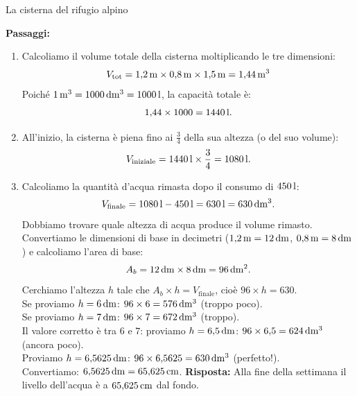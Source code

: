 \begin{esercizio}{La cisterna del rifugio alpino}
\begin{soluzione}
  \textbf{Passaggi:}
  \begin{enumerate}[label=\alph*)]
    \item Calcoliamo il volume totale della cisterna moltiplicando le tre dimensioni:
    \[
    V_{\text{tot}} = 1{,}2\,\mathrm{m} \times 0{,}8\,\mathrm{m} \times 1{,}5\,\mathrm{m} = 1{,}44\,\mathrm{m^3}
    \]
    Poiché $1\,\mathrm{m^3} = 1000\,\mathrm{dm^3} = 1000\,\mathrm{l}$, la capacità totale è:
    \[
    1{,}44 \times 1000 = 1440\,\mathrm{l}.
    \]
    \item All'inizio, la cisterna è piena fino ai $\frac{3}{4}$ della sua altezza (o del suo volume):
    \[
    V_{\text{iniziale}} = 1440\,\mathrm{l} \times \frac{3}{4} = 1080\,\mathrm{l}.
    \]
    \item Calcoliamo la quantità d'acqua rimasta dopo il consumo di $450\,\mathrm{l}$:
    \[
    V_{\text{finale}} = 1080\,\mathrm{l} - 450\,\mathrm{l} = 630\,\mathrm{l} = 630\,\mathrm{dm^3}.
    \]
    Dobbiamo trovare quale altezza di acqua produce il volume rimasto. Convertiamo le dimensioni di base in decimetri ($1{,}2\,\mathrm{m} = 12\,\mathrm{dm}$, $0{,}8\,\mathrm{m} = 8\,\mathrm{dm}$) e calcoliamo l'area di base:
    \[
    A_b = 12\,\mathrm{dm} \times 8\,\mathrm{dm} = 96\,\mathrm{dm^2}.
    \]
    Cerchiamo l'altezza $h$ tale che $A_b \times h = V_{\text{finale}}$, cioè $96 \times h = 630$.\\
    Se proviamo $h = 6\,\mathrm{dm}$: $96 \times 6 = 576\,\mathrm{dm^3}$ (troppo poco).\\
    Se proviamo $h = 7\,\mathrm{dm}$: $96 \times 7 = 672\,\mathrm{dm^3}$ (troppo).\\
    Il valore corretto è tra $6$ e $7$: proviamo $h = 6{,}5\,\mathrm{dm}$: $96 \times 6{,}5 = 624\,\mathrm{dm^3}$ (ancora poco).\\
    Proviamo $h = 6{,}5625\,\mathrm{dm}$: $96 \times 6{,}5625 = 630\,\mathrm{dm^3}$ (perfetto!).\\
    Convertiamo: $6{,}5625\,\mathrm{dm} = 65{,}625\,\mathrm{cm}$.
    \textbf{Risposta:} Alla fine della settimana il livello dell'acqua è a $65{,}625\,\mathrm{cm}$ dal fondo.
  \end{enumerate}
\end{soluzione}
\end{esercizio}

\condnewpage


